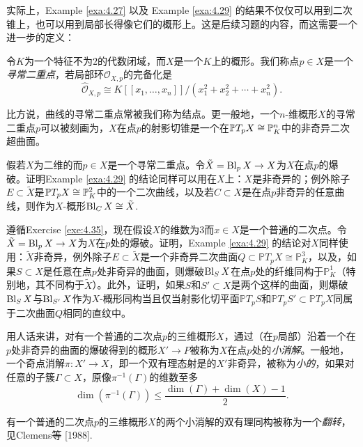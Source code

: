 实际上，Example \ref{exa:4.27} 以及 Example \ref{exa:4.29} 的结果不仅仅可以用到二次锥上，也可以用到局部长得像它们的概形上。这是后续习题的内容，而这需要一个进一步的定义：

\begin{defi}\label{defi:4.34}
	令$K$为一个特征不为$2$的代数闭域，而$X$是一个$K$上的概形。我们称点$p\in X$是一个\textit{寻常二重点}，若局部环$\mathscr O_{X,p}$的完备化是
	\[
		\hat{\mathscr O}_{X,p}\cong K[\![x_1,\dots,x_n]\!]/(x_1^2+x_2^2+\cdots+x_n^2).
	\]
\end{defi}


比方说，曲线的寻常二重点常被我们称为结点。更一般地，一个$n$-维概形$X$的寻常二重点$p$可以被刻画为，$X$在点$p$的射影切锥是一个在$\mathbb{P} T_pX\cong \mathbb{P}_K^n$中的非奇异二次超曲面。

\begin{exe}\label{exe:4.35}
	假若$X$为二维的而$p\in X$是一个寻常二重点。令$\tilde X=\operatorname{Bl}_p X\to X$为$X$在点$p$的爆破。证明Example \ref{exa:4.29} 的结论同样可以用在$X$上：$X$是非奇异的；例外除子$E\subset \tilde X$是$\mathbb{P} T_pX\cong \mathbb{P}_K^2$中的一个二次曲线，以及若$C\subset X$是在点$p$非奇异的任意曲线，则作为$X$-概形$\operatorname{Bl}_C X\cong \tilde X$.
\end{exe}

\begin{exe}\label{exe:4.36}
	遵循Exercise \ref{exe:4.35}，现在假设$X$的维数为$3$而$x\in X$是一个普通的二次点。令$\tilde X=\operatorname{Bl}_p X\to X$为$X$在$p$处的爆破。证明，Example \ref{exa:4.29} 的结论对$X$同样使用：$\tilde X$非奇异，例外除子$E\subset \tilde X$是一个非奇异二次曲面$Q\subset \mathbb PT_pX\cong \mathbb P_K^3$，以及，如果$S\subset X$是任意在点$p$处非奇异的曲面，则爆破$\operatorname{Bl}_SX$在点$p$处的纤维同构于$\mathbb P_K^1$（特别地，其不同构于$\tilde X$）。此外，证明，如果$S$和$S'\subset X$是两个这样的曲面，则爆破$\operatorname{Bl}_SX$与$\operatorname{Bl}_{S'}X$作为$X$-概形同构当且仅当射影化切平面$\mathbb PT_pS$和$\mathbb PT_pS'\subset \mathbb PT_pX$同属于二次曲面$Q$相同的直纹中。
\end{exe}

用人话来讲，对有一个普通的二次点$p$的三维概形$X$，通过（在$p$局部）沿着一个在$p$处非奇异的曲面的爆破得到的概形$X'\to P$被称为$X$在点$p$处的\textit{小消解}。一般地，一个奇点消解$\pi:X'\to X$，即一个双有理态射是的$X'$非奇异，被称为\textit{小的}，如果对任意的子簇$\Gamma\subset X$，原像$\pi^{-1}(\Gamma)$的维数至多
\[
	\dim (\pi^{-1}(\Gamma))\leq \frac{\dim(\Gamma)+\dim(X)-1}2 .
\]

有一个普通的二次点$p$的三维概形$X$的两个小消解的双有理同构被称为一个\textit{翻转}，见Clemens等 [1988].

